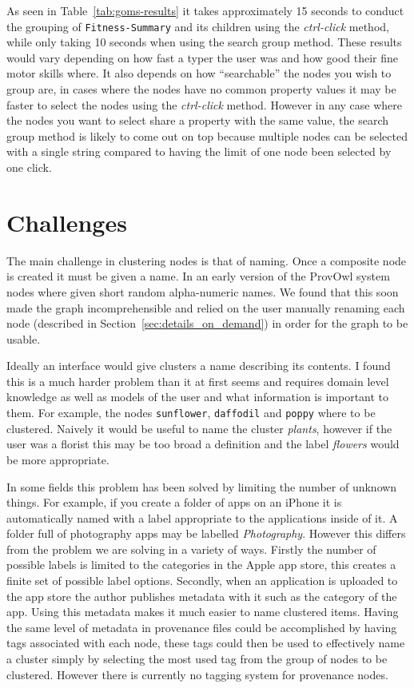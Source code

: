 As seen in Table~\ref{tab:goms-results} it takes approximately 15 seconds to conduct the grouping of \texttt{Fitness-Summary} and its children using the \textit{ctrl-click} method, while only taking 10 seconds when using the search group method. These results would vary depending on how fast a typer the user was and how good their fine motor skills where. It also depends on how ``searchable'' the nodes you wish to group are, in cases where the nodes have no common property values it may be faster to select the nodes using the \textit{ctrl-click} method. However in any case where the nodes you want to select share a property with the same value, the search group method is likely to come out on top because multiple nodes can be selected with a single string compared to having the limit of one node been selected by one click.

\section{Challenges}
\label{sec:naming_composite_nodes}

The main challenge in clustering nodes is that of naming. Once a composite node is created it must be given a name. In an early version of the ProvOwl system nodes where given short random alpha-numeric names. We found that this soon made the graph incomprehensible and relied on the user manually renaming each node (described in Section~\ref{sec:details_on_demand}) in order for the graph to be usable. 

Ideally an interface would give clusters a name describing its contents. I found this is a much harder problem than it at first seems and requires domain level knowledge as well as models of the user and what information is important to them. For example, the nodes \texttt{sunflower}, \texttt{daffodil} and \texttt{poppy} where to be clustered. Naively it would be useful to name the cluster \textit{plants}, however if the user was a florist this may be too broad a definition and the label \textit{flowers} would be more appropriate.

In some fields this problem has been solved by limiting the number of unknown things. For example, if you create a folder of apps on an iPhone it is automatically named with a label appropriate to the applications inside of it. A folder full of photography apps may be labelled \textit{Photography}. However this differs from the problem we are solving in a variety of ways. Firstly the number of possible labels is limited to the categories in the Apple app store, this creates a finite set of possible label options. Secondly, when an application is uploaded to the app store the author publishes metadata with it such as the category of the app. Using this metadata makes it much easier to name clustered items. Having the same level of metadata in provenance files could be accomplished by having tags associated with each node, these tags could then be used to effectively name a cluster simply by selecting the most used tag from the group of nodes to be clustered. However there is currently no tagging system for provenance nodes.

